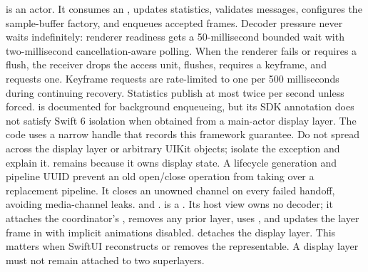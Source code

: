 {} is an actor. It consumes an , updates statistics, validates messages, configures the sample-buffer factory, and enqueues accepted frames. Decoder pressure never waits indefinitely: renderer readiness gets a 50-millisecond bounded wait with two-millisecond cancellation-aware polling.\markdownRendererParagraphSeparator
{}When the renderer fails or requires a flush, the receiver drops the access unit, flushes, requires a keyframe, and requests one. Keyframe requests are rate-limited to one per 500 milliseconds during continuing recovery. Statistics publish at most twice per second unless forced.\markdownRendererParagraphSeparator
{} is documented for background enqueueing, but its SDK annotation does not satisfy Swift 6 isolation when obtained from a main-actor display layer. The code uses a narrow  handle that records this framework guarantee. Do not spread  across the display layer or arbitrary UIKit objects; isolate the exception and explain it.\markdownRendererParagraphSeparator
{} remains  because it owns display state. A lifecycle generation and pipeline UUID prevent an old open/close operation from taking over a replacement pipeline. It closes an unowned channel on every failed handoff, avoiding media-channel leaks.\markdownRendererInterblockSeparator
{}
\markdownRendererSectionEnd \markdownRendererSectionBegin
{}\markdownRendererInterblockSeparator
{}\markdownRendererBlockQuoteBegin
{}  and .\markdownRendererBlockQuoteEnd \markdownRendererInterblockSeparator
{} is a . Its host view owns no decoder; it attaches the coordinator's , removes any prior layer, uses , and updates the layer frame in  with implicit animations disabled.\markdownRendererParagraphSeparator
{} detaches the display layer. This matters when SwiftUI reconstructs or removes the representable. A display layer must not remain attached to two superlayers.\markdownRendererParagraphSeparator
